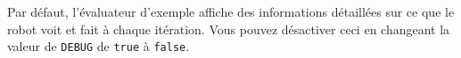 \documentclass[12pt]{article}
\begin{document}
Par défaut, l'évaluateur d'exemple affiche des informations détaillées sur ce que le robot voit et fait à chaque itération. Vous pouvez désactiver ceci en changeant la valeur de \texttt{DEBUG} de \texttt{true} à \texttt{false}.
\end{document}

